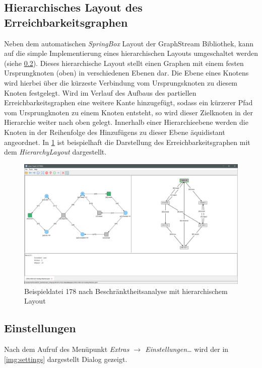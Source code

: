 \subsection{Hierarchisches Layout des Erreichbarkeitsgraphen}
Neben dem automatischen \emph{SpringBox} Layout der GraphStream Bibliothek, kann
auf die simple Implementierung eines hierarchischen Layouts umgeschaltet werden
(siehe \cref{sec:settings}). Dieses hierarchische Layout stellt einen Graphen
mit einem festen Ursprungknoten (oben) in verschiedenen Ebenen dar. Die Ebene
eines Knotens wird hierbei über die kürzeste Verbindung vom Ursprungsknoten zu
diesem Knoten festgelegt. Wird im Verlauf des Aufbaus des partiellen
Erreichbarkeitsgraphen eine weitere Kante hinzugefügt, sodass ein kürzerer Pfad
vom Ursprungknoten zu einem Knoten entsteht, so wird dieser Zielknoten in der
Hierarchie weiter nach oben gelegt. Innerhalb einer Hierarchieebene werden die
Knoten in der Reihenfolge des Hinzufügens zu dieser Ebene äquidistant
angeordnet. In \cref{img:ex178_hierarchy} ist beispielhaft die Darstellung des
Erreichbarkeitsgraphen mit dem \emph{HierarchyLayout} dargestellt.

\begin{figure}[ht!]
  \centering
  \includegraphics[width=\textwidth]{../img/Screenshot_178_hierarchy_layout.png}
  \caption{Beispieldatei 178 nach Beschränktheitsanalyse mit hierarchischem Layout}
  \label{img:ex178_hierarchy}
\end{figure}

\subsection{Einstellungen}
\label{sec:settings}
Nach dem Aufruf des Menüpunkt \emph{Extras $\rightarrow$ Einstellungen\ldots}
wird der in \cref{img:settings} dargestellt Dialog gezeigt.

